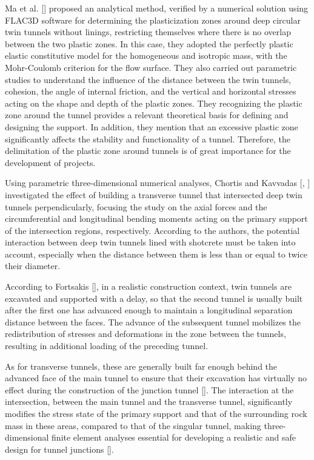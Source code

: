 \documentclass[a4paper,fleqn]{cas-sc}
\begin{document}
Ma et al. [] proposed an analytical method, verified by a numerical solution using FLAC3D software for determining the plasticization zones around deep circular twin tunnels without linings, restricting themselves where there is no overlap between the two plastic zones. In this case, they adopted the perfectly plastic elastic constitutive model for the homogeneous and isotropic mass, with the Mohr-Coulomb criterion for the flow surface. They also carried out parametric studies to understand the influence of the distance between the twin tunnels, cohesion, the angle of internal friction, and the vertical and horizontal stresses acting on the shape and depth of the plastic zones. They recognizing the plastic zone around the tunnel provides a relevant theoretical basis for defining and designing the support. In addition, they mention that an excessive plastic zone significantly affects the stability and functionality of a tunnel. Therefore, the delimitation of the plastic zone around tunnels is of great importance for the development of projects.

Using parametric three-dimensional numerical analyses, Chortis and Kavvadas [, ] investigated the effect of building a transverse tunnel that intersected deep twin tunnels perpendicularly, focusing the study on the axial forces and the circumferential and longitudinal bending moments acting on the primary support of the intersection regions, respectively. According to the authors, the potential interaction between deep twin tunnels lined with shotcrete must be taken into account, especially when the distance between them is less than or equal to twice their diameter.

According to Fortsakis [], in a realistic construction context, twin tunnels are excavated and supported with a delay, so that the second tunnel is usually built after the first one has advanced enough to maintain a longitudinal separation distance between the faces. The advance of the subsequent tunnel mobilizes the redistribution of stresses and deformations in the zone between the tunnels, resulting in additional loading of the preceding tunnel.

As for transverse tunnels, these are generally built far enough behind the advanced face of the main tunnel to ensure that their excavation has virtually no effect during the construction of the junction tunnel []. The interaction at the intersection, between the main tunnel and the transverse tunnel, significantly modifies the stress state of the primary support and that of the surrounding rock mass in these areas, compared to that of the singular tunnel, making three-dimensional finite element analyses essential for developing a realistic and safe design for tunnel junctions [].
\end{document}
